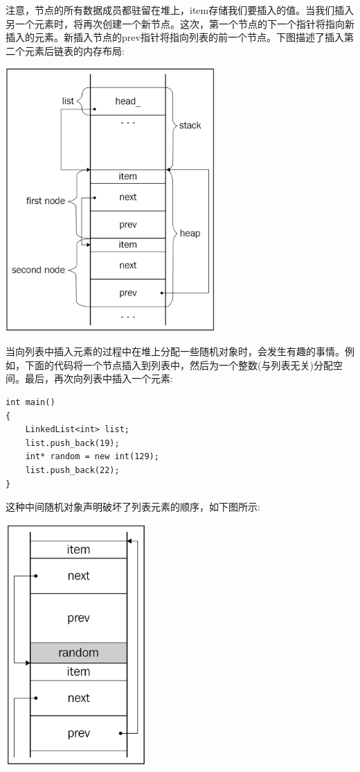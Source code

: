 注意，节点的所有数据成员都驻留在堆上，item存储我们要插入的值。当我们插入另一个元素时，将再次创建一个新节点。这次，第一个节点的下一个指针将指向新插入的元素。新插入节点的prev指针将指向列表的前一个节点。下图描述了插入第二个元素后链表的内存布局: \par

\begin{center}
	\includegraphics[width=0.6\textwidth]{content/Section-2/Chapter-6/13}
\end{center}

当向列表中插入元素的过程中在堆上分配一些随机对象时，会发生有趣的事情。例如，下面的代码将一个节点插入到列表中，然后为一个整数(与列表无关)分配空间。最后，再次向列表中插入一个元素: \par

\begin{lstlisting}[caption={}]
int main()
{
	LinkedList<int> list;
	list.push_back(19);
	int* random = new int(129);
	list.push_back(22);
}
\end{lstlisting}

这种中间随机对象声明破坏了列表元素的顺序，如下图所示: \par

\begin{center}
	\includegraphics[width=0.4\textwidth]{content/Section-2/Chapter-6/14}
\end{center}

